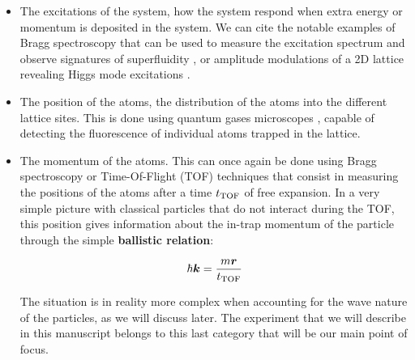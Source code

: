 \begin{itemize}
 \item The excitations of the system, \ie how the system respond when extra energy or momentum is deposited in the system. We can cite the notable examples of Bragg spectroscopy that can be used to measure the excitation spectrum and observe signatures of superfluidity \cite{sobirey2021observation,steinhauer2002excitation}, or amplitude modulations of a 2D lattice revealing Higgs mode excitations \cite{endres2012higgs}. 
 \item The position of the atoms, \ie the distribution of the atoms into the different lattice sites. This is done using quantum gases microscopes \cite{bakr2009quantum,cheuk2015quantum,sherson2010single}, capable of detecting the fluorescence of individual atoms trapped in the lattice.
 \item The momentum of the atoms. This can once again be done using Bragg spectroscopy \cite{clement2009exploring,stenger1999} or Time-Of-Flight (TOF) techniques \cite{greiner2002quantum,spielman2008condensate,xu2006observation} that consist in measuring the positions of the atoms after a time $t_{\rm{TOF}}$ of free expansion. In a very simple picture with classical particles that do not interact during the TOF, this position gives information about the in-trap momentum of the particle through the simple \textbf{ballistic relation}:

\begin{equation}
    \hbar \bm{k} = \frac{m \bm{r}}{t_{\rm{TOF}}}
\end{equation} 

The situation is in reality more complex when accounting for the wave nature of the particles, as we will discuss later. The experiment that we will describe in this manuscript belongs to this last category that will be our main point of focus.
\end{itemize}




